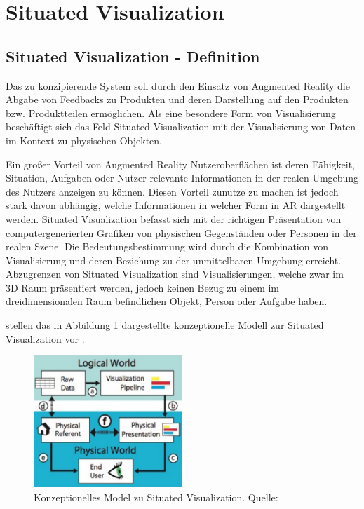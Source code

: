 \section{Situated Visualization}
\subsection{Situated Visualization - Definition}


Das zu konzipierende System soll durch den Einsatz von Augmented Reality die Abgabe von Feedbacks zu Produkten und deren Darstellung auf den Produkten bzw. Produktteilen ermöglichen. 
Als eine besondere Form von Visualisierung beschäftigt sich das Feld Situated Visualization mit der Visualisierung von Daten im Kontext zu physischen Objekten. 

\cite[S.~239]{DieterSchmalstieg2016} Ein großer Vorteil von Augmented Reality Nutzeroberflächen ist deren Fähigkeit, Situation, Aufgaben oder Nutzer-relevante Informationen in 
der realen Umgebung des Nutzers anzeigen zu können. Diesen Vorteil zunutze zu machen ist jedoch stark davon abhängig, welche Informationen in welcher Form in AR dargestellt werden.
Situated Visualization befasst sich mit der richtigen Präsentation von computergenerierten
Grafiken von physischen Gegenständen oder Personen in der realen Szene. \cite[S.~188]{Marriott2018} Die Bedeutungsbestimmung wird durch die Kombination von Visualisierung und deren 
Beziehung zu der unmittelbaren Umgebung erreicht. \cite[S.~240]{DieterSchmalstieg2016} Abzugrenzen von Situated Visualization sind Visualisierungen, welche zwar im 3D Raum präsentiert werden, jedoch keinen Bezug zu einem im dreidimensionalen Raum befindlichen Objekt, Person oder Aufgabe haben.

\citeauthor{Willett2017} stellen das in Abbildung \ref{img:situated_visualization_concept} dargestellte konzeptionelle Modell 
zur Situated Visualization vor\cite[S.~2]{Willett2017} \cite[S.~192]{Marriott2018}.

\begin{figure}[H]
	\centering
	\includegraphics[width=0.5\textwidth]{resources/fundamentals/situated_visualization/spacially_situated_visualization_model.png}
	\caption{Konzeptionelles Model zu Situated Visualization. Quelle: \cite[S.~192]{Marriott2018}}
	\label{img:situated_visualization_concept}
\end{figure}

